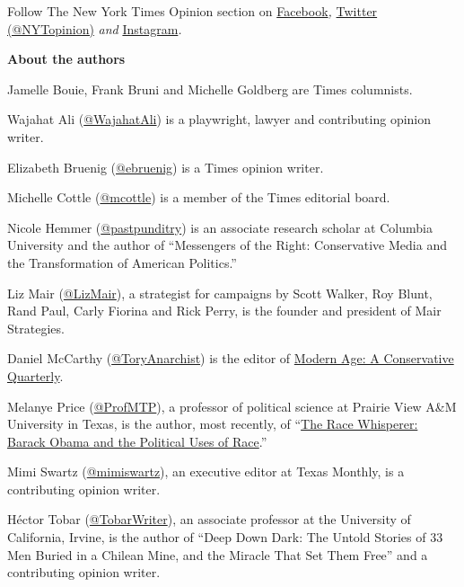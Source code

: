 Follow The New York Times Opinion section on
\href{https://www.facebookcorewwwi.onion/nytopinion}{Facebook}\emph{,}
\href{http://twitter.com/NYTOpinion}{Twitter (@NYTopinion)} \emph{and}
\href{https://www.instagram.com/nytopinion/}{Instagram}\emph{.}

\textbf{About the authors}

Jamelle Bouie, Frank Bruni and Michelle Goldberg are Times columnists.

Wajahat Ali
(\href{https://twitter.com/WajahatAli?ref_src=twsrc\%5Egoogle\%7Ctwcamp\%5Eserp\%7Ctwgr\%5Eauthor}{@WajahatAli})
is a playwright, lawyer and contributing opinion writer.

Elizabeth Bruenig (\href{https://twitter.com/ebruenig}{@ebruenig}) is a
Times opinion writer.

Michelle Cottle (\href{https://twitter.com/mcottle}{@mcottle}) is a
member of the Times editorial board.

Nicole Hemmer
(\href{https://twitter.com/pastpunditry?ref_src=twsrc\%5Egoogle\%7Ctwcamp\%5Eserp\%7Ctwgr\%5Eauthor}{@pastpunditry})
is an associate research scholar at Columbia University and the author
of ``Messengers of the Right: Conservative Media and the Transformation
of American Politics.''

Liz Mair (\href{https://twitter.com/LizMair}{@LizMair}), a strategist
for campaigns by Scott Walker, Roy Blunt, Rand Paul, Carly Fiorina and
Rick Perry, is the founder and president of Mair Strategies.

Daniel McCarthy
(\href{https://twitter.com/ToryAnarchist}{@ToryAnarchist}) is the editor
of \href{https://home.isi.org/modern-age}{Modern Age: A Conservative
Quarterly}.

Melanye Price (\href{https://twitter.com/ProfMTP}{@ProfMTP}), a
professor of political science at Prairie View A\&M University in Texas,
is the author, most recently, of
``\href{https://nyupress.org/9781479819256/the-race-whisperer/}{The Race
Whisperer: Barack Obama and the Political Uses of Race}.''

Mimi Swartz (\href{https://twitter.com/mimiswartz}{@mimiswartz}), an
executive editor at Texas Monthly, is a contributing opinion writer.

Héctor Tobar
(\href{https://twitter.com/TobarWriter?ref_src=twsrc\%5Egoogle\%7Ctwcamp\%5Eserp\%7Ctwgr\%5Eauthor}{@TobarWriter}),
an associate professor at the University of California, Irvine, is the
author of ``Deep Down Dark: The Untold Stories of 33 Men Buried in a
Chilean Mine, and the Miracle That Set Them Free'' and a contributing
opinion writer.

